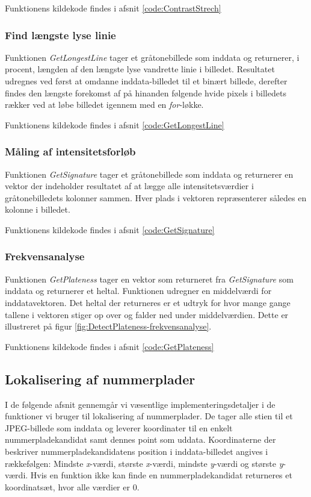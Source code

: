 Funktionens kildekode findes i afsnit \vref{code:ContrastStrech}

\subsubsection{Find længste lyse linie}
\label{sec:imp:GetLongestLine}
Funktionen \textit{GetLongestLine} tager et gråtonebillede som inddata og returnerer, i procent, længden af den længste lyse vandrette linie i billedet. Resultatet udregnes ved først at omdanne inddata-billedet til et binært billede, derefter findes den længste forekomst af på hinanden følgende hvide pixels i billedets rækker ved at løbe billedet igennem med en \textit{for}-løkke.  

Funktionens kildekode findes i afsnit \vref{code:GetLongestLine}

\subsubsection{Måling af intensitetsforløb}
\label{sec:imp:GetSignature}
Funktionen \textit{GetSignature} tager et gråtonebillede som inddata og returnerer en vektor der indeholder resultatet af at lægge alle intensitetsværdier i gråtonebilledets kolonner sammen. Hver plads i vektoren repræsenterer således en kolonne i billedet.

Funktionens kildekode findes i afsnit \vref{code:GetSignature}

\subsubsection{Frekvensanalyse}
\label{sec:imp:GetPlateness}
Funktionen \textit{GetPlateness} tager en vektor som returneret fra \textit{GetSignature} som inddata og returnerer et heltal. Funktionen udregner en middelværdi for inddatavektoren. Det heltal der returneres er et udtryk for hvor mange gange tallene i vektoren stiger op over og falder ned under middelværdien. Dette er illustreret på figur \vref{fig:DetectPlateness-frekvensanalyse}.

Funktionens kildekode findes i afsnit \vref{code:GetPlateness}


\subsection{Lokalisering af nummerplader}
I de følgende afsnit gennemgår vi væsentlige implementeringsdetaljer i de funktioner vi bruger til lokalisering af nummerplader. De tager alle stien til et JPEG-billede som inddata og leverer koordinater til en enkelt nummerpladekandidat samt dennes point som uddata. Koordinaterne der beskriver nummerpladekandidatens position i inddata-billedet angives i rækkefølgen: Mindste \textit{x}-værdi, største \textit{x}-værdi, mindste \textit{y}-værdi og største \textit{y}-værdi. Hvis en funktion ikke kan finde en nummerpladekandidat returneres et koordinatsæt, hvor alle værdier er $0$.

